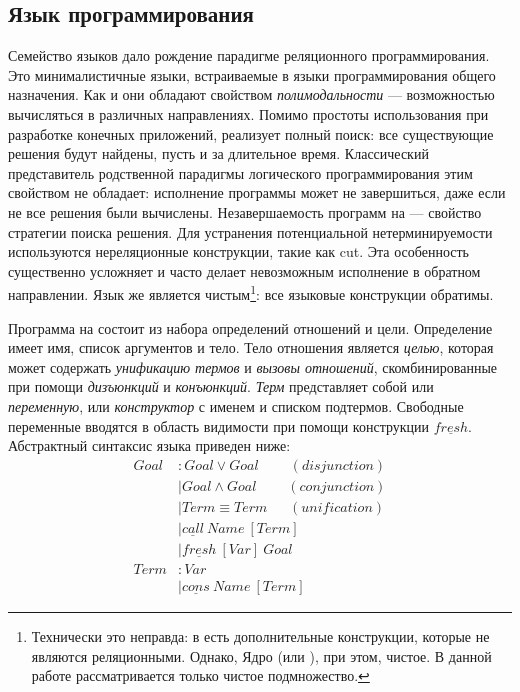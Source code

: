 \subsection{Язык программирования \miniKanren{}}

Семейство языков \miniKanren{} дало рождение парадигме реляционного программирования. 
Это минималистичные языки, встраиваемые в языки программирования общего назначения. 
Как и \prolog{} они обладают свойством \emph{полимодальности} --- возможностью вычисляться в различных направлениях.
Помимо простоты использования при разработке конечных приложений, \miniKanren{} реализует полный поиск: все существующие решения будут найдены, пусть и за длительное время.
Классический представитель родственной парадигмы логического программирования \prolog{} этим свойством не обладает: исполнение программы может не завершиться, даже если не все решения были вычислены. 
Незавершаемость программ на \prolog{} --- свойство стратегии поиска решения.
Для устранения потенциальной нетерминируемости используются нереляционные конструкции, такие как cut. 
Эта особенность существенно усложняет и часто делает невозможным исполнение в обратном направлении. 
Язык \miniKanren{} же является чистым\footnote{Технически это неправда: в \miniKanren{} есть дополнительные конструкции, которые не являются реляционными. Однако, Ядро (или \microKanren{}), при этом, чистое. В данной работе рассматривается только чистое подмножество.}: все языковые конструкции обратимы.

Программа на \miniKanren{} состоит из набора определений отношений и цели. 
Определение имеет имя, список аргументов и тело.
Тело отношения является \textit{целью}, которая может содержать \textit{унификацию термов} и \textit{вызовы отношений}, скомбинированные при помощи \textit{дизъюнкций} и \textit{конъюнкций}. 
\textit{Терм} представляет собой или \textit{переменную}, или \textit{конструктор} с именем и списком подтермов. 
Свободные переменные вводятся в область видимости при помощи конструкции $\underline{fresh}$. 
Абстрактный синтаксис языка приведен ниже:
\begin{align*}
  Goal &: Goal \vee Goal \ \ \ \ \ \ \ \ \ \ (disjunction) \\
       &\mid Goal \wedge Goal \ \ \ \ \ \ \ \ \ \ (conjunction) \\
       &\mid Term \equiv Term \ \ \ \ \ \ \ (unification) \\
       &\mid \underline{call} \ Name \ [Term] \\
       &\mid \underline{fresh} \ [Var] \ Goal \\
  Term &: Var \\ 
       &\mid \underline{cons} \ Name \ [Term]
\end{align*}

